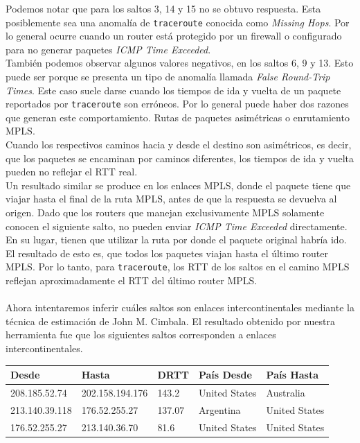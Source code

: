 Podemos notar que para los saltos 3, 14 y 15 no se obtuvo respuesta. Esta posiblemente sea una anomalía de \texttt{traceroute} conocida como \emph{Missing Hops}. Por lo general ocurre cuando un router está protegido por un firewall o configurado para no generar paquetes \emph{ICMP Time Exceeded}.   
\\
También podemos observar algunos valores negativos, en los saltos 6, 9 y 13. Esto puede ser porque se presenta un tipo de anomalía llamada \emph{False Round-Trip Times}. Este caso suele darse cuando los tiempos de ida y vuelta de un paquete reportados por \texttt{traceroute} son erróneos. Por lo general puede haber dos razones que generan este comportamiento. Rutas de paquetes asimétricas o enrutamiento MPLS. 
\\
Cuando los respectivos caminos hacia y desde el destino son asimétricos, es decir, que los paquetes se encaminan por caminos diferentes, los tiempos de ida y vuelta pueden no reflejar el RTT real.
\\
Un resultado similar se produce en los enlaces MPLS, donde el paquete tiene que viajar hasta el final de la ruta MPLS, antes de que la respuesta se devuelva al origen. Dado que los routers que manejan exclusivamente MPLS solamente conocen el siguiente salto, no pueden enviar \emph{ICMP Time Exceeded} directamente. En su lugar, tienen que utilizar la ruta por donde el paquete original habría ido. El resultado de esto es, que todos los paquetes viajan hasta el último router MPLS. Por lo tanto, para \texttt{traceroute}, los RTT de los saltos en el camino MPLS reflejan aproximadamente el RTT del último router MPLS.
\\\\
Ahora intentaremos inferir cuáles saltos son enlaces intercontinentales mediante la técnica de estimación de John M. Cimbala.
El resultado obtenido por nuestra herramienta fue que los siguientes saltos corresponden a enlaces intercontinentales.

\begin{center}
    \begin{tabular}{| l | l | l | l | l | }
    \hline
    Desde                & Hasta                  & DRTT   & País Desde      & País Hasta \\ \hline
    208.185.52.74   & 202.158.194.176 & 143.2   &  United States  & Australia      \\ \hline
    213.140.39.118 & 176.52.255.27     & 137.07 &  Argentina        & United States \\ \hline
    176.52.255.27   & 213.140.36.70     & 81.6     &United States    & United States \\ \hline
  \end{tabular}
\end{center}

